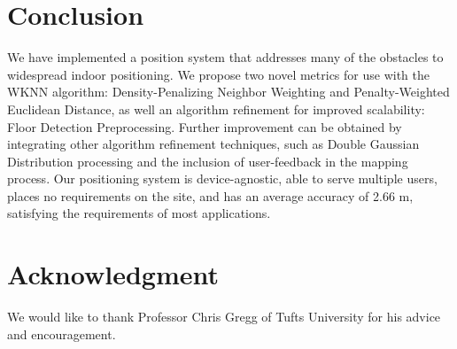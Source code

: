 \documentclass[conference]{IEEEtran}
\begin{document}
\section{Conclusion}
We have implemented a position system that addresses many of the obstacles to widespread indoor positioning. We propose two novel metrics for use with the WKNN algorithm: Density-Penalizing Neighbor Weighting and Penalty-Weighted Euclidean Distance, as well an algorithm refinement for improved scalability: Floor Detection Preprocessing. Further improvement can be obtained by integrating other algorithm refinement techniques, such as Double Gaussian Distribution processing and the inclusion of user-feedback in the mapping process. Our positioning system is device-agnostic, able to serve multiple users, places no requirements on the site, and has an average accuracy of 2.66 m, satisfying the requirements of most applications.

\section*{Acknowledgment}
We would like to thank Professor Chris Gregg of Tufts University for his advice and encouragement.


\end{document}
